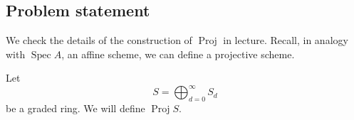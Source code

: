 
\subsection*{Problem statement}

We check the details of the construction of \(\operatorname{Proj}\) in lecture. Recall, in analogy with
\(\operatorname{Spec} A\), an affine scheme, we can define a projective scheme.

Let
\[
S=\bigoplus_{d=0}^{\infty}S_d
\]
be a graded ring. We will define \(\operatorname{Proj} S\).

